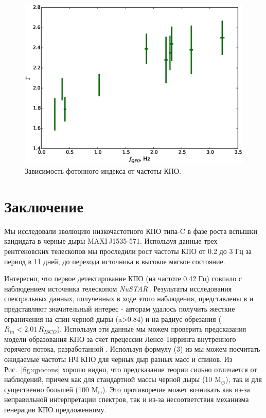 \documentclass{pazhb}
\def\maxisrc{MAXI\,J1535-571}
\def\nustar{{\em NuSTAR\,}}
\begin{document}
\begin{figure}
\centerline{\includegraphics[width=\linewidth]{g_vs_f_v01.eps}}
\caption{Зависимость фотонного индекса от частоты КПО.}
\label{fig:gvsf}
\end{figure}

\section{Заключение}

Мы исследовали эволюцию низкочастотного КПО типа-C в фазе роста вспышки кандидата в черные дыры \maxisrc. Используя данные трех рентгеновских телескопов мы проследили рост частоты КПО от 0.2 до 3 Гц за период в 11 дней, до перехода источника в высокое мягкое состояние.

Интересно, что первое детектирование КПО (на частоте 0.42 Гц) совпало с наблюдением источника телескопом \nustar. Результаты исследования спектральных данных, полученных в ходе этого наблюдения, представлены в  \cite{xu17} и представляют значительный интерес - авторам удалось получить жесткие ограничения на спин черной дыры (a>0.84) и на радиус обрезания ($R_{in}<2.01\,R_{ISCO}$). Используя эти данные мы можем проверить предсказания модели образования КПО за счет прецессии Ленсе-Тирринга внутренного горячего потока, разработанной \cite{ingram09}. Используя формулу (3) из \cite{ingram14} мы можем посчитать ожидаемые частоты НЧ КПО для черных дыр разных масс и спинов. Из Рис.~\ref{fig:qpocons} хорошо видно, что предсказание теории сильно отличается от наблюдений, причем как для стандартной массы черной дыры (10 M$_{\odot}$), так и для существенно большей (100 M$_{\odot}$). Это противоречие может возникать как из-за неправильной интерпретации спектров, так и из-за несоответствия механизма генерации КПО предложенному.
\end{document}
